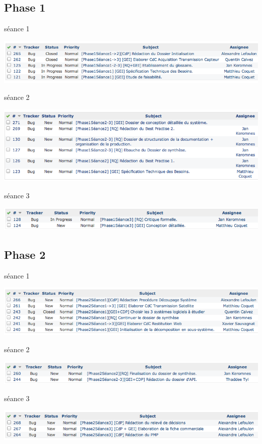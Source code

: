 \subsection{Phase 1}
séance 1 
\begin {center}
\includegraphics[width=\textwidth]{png/Phase1Seance1.png}
\end {center}
séance 2
\begin {center}
\includegraphics[width=\textwidth]{png/Phase1Seance2.png}
\end {center}
séance 3
\begin {center}
\includegraphics[width=\textwidth]{png/Phase1Seance3.png}
\end {center}
\subsection{Phase 2}
séance 1
\begin {center}
\includegraphics[width=\textwidth]{png/Phase2Seance1.png}
\end {center}
séance 2
\begin {center}
\includegraphics[width=\textwidth]{png/Phase2Seance2.png}
\end {center}
séance 3
\begin {center}
\includegraphics[width=\textwidth]{png/Phase2Seance3.png}
\end {center}

